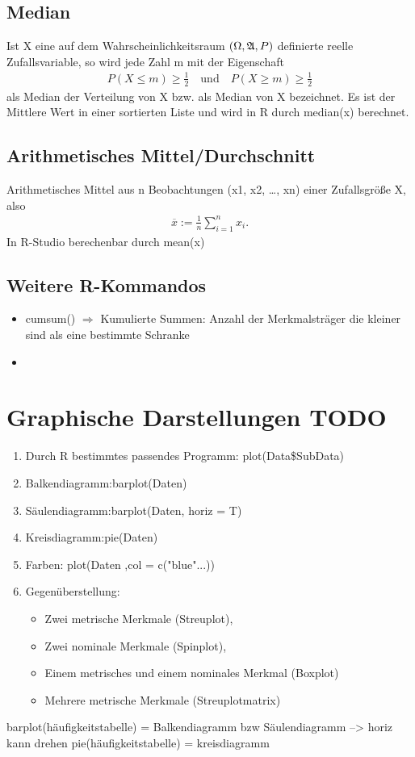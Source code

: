 \documentclass[a4paper,10pt]{scrartcl}
\begin{document}
\subsection{Median}
Ist X eine auf dem Wahrscheinlichkeitsraum $({\rm{\Omega }},{\mathfrak{A}},P)$ definierte reelle Zufallsvariable, so wird jede Zahl m mit der Eigenschaft 
\begin{eqnarray}P(X\le m)\ge \frac{1}{2}\quad \text{und}\quad P(X\ge m)\ge \frac{1}{2}\end{eqnarray}
als Median der Verteilung von X bzw. als Median von X bezeichnet. Es ist der Mittlere Wert in einer sortierten Liste und wird in R durch median(x) berechnet.
\subsection{Arithmetisches Mittel/Durchschnitt}
Arithmetisches Mittel aus n Beobachtungen (x1, x2, …, xn) einer Zufallsgröße X, also \begin{eqnarray}\overline{x}:=\frac{1}{n}\displaystyle \sum _{i=1}^{n}{x}_{i}.\end{eqnarray}
In R-Studio berechenbar durch mean(x)
\subsection{Weitere R-Kommandos}
\begin{itemize}
    \item cumsum() $\Rightarrow$ Kumulierte Summen:\newline 
    Anzahl der Merkmalsträger die kleiner sind als eine bestimmte Schranke
    \item 
    \end{itemize}
\newpage
\section{Graphische Darstellungen TODO}
\begin{enumerate}
    \item Durch R bestimmtes passendes Programm: plot(Data\$SubData)
    \item Balkendiagramm:barplot(Daten)
    \item Säulendiagramm:barplot(Daten, horiz = T)
    \item Kreisdiagramm:pie(Daten)
    \item Farben: plot(Daten ,col = c("blue"...))
    \item Gegenüberstellung:
    \begin{itemize}
        \item Zwei metrische Merkmale (Streuplot), 
        \item Zwei nominale Merkmale (Spinplot), 
        \item Einem metrisches und einem nominales Merkmal (Boxplot)
        \item Mehrere metrische Merkmale (Streuplotmatrix)
    \end{itemize}
\end{enumerate}
barplot(häufigkeitstabelle) = Balkendiagramm bzw Säulendiagramm --> horiz kann drehen
pie(häufigkeitstabelle) = kreisdiagramm
\end{document}
